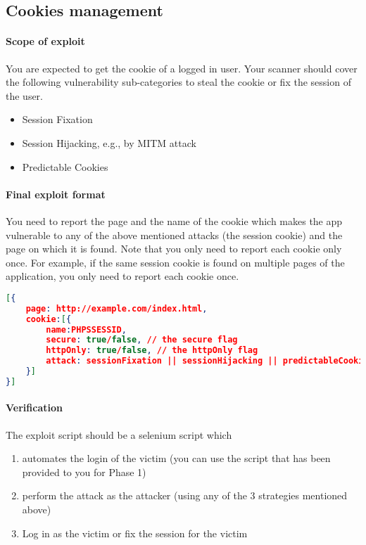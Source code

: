 \documentclass{article}[10pt]
\begin{document}
\subsection{Cookies management}
\paragraph{Scope of exploit}
You are expected to get the cookie of a logged in user. Your scanner should cover the following vulnerability sub-categories to steal the cookie or fix the session of the user.
	\begin{itemize}
		\item Session Fixation
		\item Session Hijacking, e.g., by MITM attack
		\item Predictable Cookies
	\end{itemize}

\paragraph{Final exploit format}
You need to report the page and the name of the cookie which makes the app vulnerable to any of the above mentioned attacks (the session cookie) and the page on which it is found. Note that you only need to report each cookie only once. For example, if the same session cookie is found on multiple pages of the application, you only need to report each cookie once. 

\begin{lstlisting}[language=json,firstnumber=1]
[{
	page: http://example.com/index.html,
	cookie:[{
		name:PHPSSESSID,
		secure: true/false, // the secure flag
		httpOnly: true/false, // the httpOnly flag
		attack: sessionFixation || sessionHijacking || predictableCookies
	}]
}]
\end{lstlisting}

\paragraph{Verification}
The exploit script should be a selenium script which
\begin{enumerate}
\item automates the login of the victim (you can use the script that has been provided to you for Phase 1)
\item perform the attack as the attacker (using any of the 3 strategies mentioned above)
\item Log in as the victim or fix the session for the victim
\end{enumerate}
\end{document}
